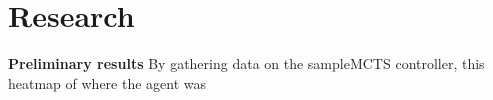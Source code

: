 \documentclass[journal]{IEEEtran}
\begin{document}


















	
\section{Research}
	\textbf{Preliminary results}
		By gathering data on the sampleMCTS controller, this heatmap of where the agent was 


	 







\end{document}
